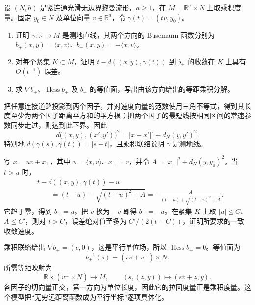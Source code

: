 \begin{exercise}\label{g3:ex:product-busemann}
	设 \((N,h)\) 是紧连通光滑无边界黎曼流形，\(a\ge1\)，在 \(M=\mathbb R^a\times N\) 上取乘积度量。固定 \(y_0\in N\) 及单位向量 \(v\in\mathbb R^a\)，令 \(\gamma(t)=(tv,y_0)\)。
	\begin{enumerate}
		\item 证明 \(\gamma:\mathbb R\to M\) 是测地直线，其两个方向的 Busemann 函数分别为 \(b_+(x,y)=\langle x,v\rangle\)、\(b_-(x,y)=-\langle x,v\rangle\)。
		\item 对每个紧集 \(K\subset M\)，证明 \(t-d((x,y),\gamma(t))\) 到 \(b_+\) 的收敛在 \(K\) 上具有 \(O(t^{-1})\) 误差。
		\item 求 \(\nabla b_+\)、\(\operatorname{Hess}b_+\) 及 \(b_+\) 的等值面，写出由该方向给出的等距乘积分解。
	\end{enumerate}
\end{exercise}
\begin{solution}
	把任意连接道路投影到两个因子，并对速度向量的范数使用三角不等式，得到其长度至少为两个因子距离平方和的平方根；把两个因子的最短线按相同区间的常速参数同步走过，则达到此下界。因此
	\[
		d\bigl((x,y),(x',y')\bigr)^2
		=|x-x'|^2+d_N(y,y')^2.
	\]
	特别地 \(d(\gamma(s),\gamma(t))=|s-t|\)，且乘积联络说明 \(\gamma\) 是测地线。

	写 \(x=uv+x_\perp\)，其中 \(u=\langle x,v\rangle\)、\(x_\perp\perp v\)，并令 \(A=|x_\perp|^2+d_N(y,y_0)^2\)。当 \(t>u\) 时，
	\[
	\begin{aligned}
		&t-d((x,y),\gamma(t))-u\\
		&\qquad=(t-u)-\sqrt{(t-u)^2+A}
		=-\frac{A}{(t-u)+\sqrt{(t-u)^2+A}}.
	\end{aligned}
	\]
	它趋于零，得到 \(b_+=u\)。把 \(v\) 换为 \(-v\) 即得 \(b_-=-u\)。在紧集 \(K\) 上取 \(|u|\le C\)、\(A\le C'\)，则对 \(t>C\)，误差绝对值至多为 \(C'/(2(t-C))\)，证明所要求的一致收敛速度。

	乘积联络给出 \(\nabla b_+=(v,0)\)，这是平行单位场，所以 \(\operatorname{Hess}b_+=0\)。等值面为
	\[
		b_+^{-1}(s)=(sv+v^\perp)\times N.
	\]
	所需等距映射为
	\[
		\mathbb R\times(v^\perp\times N)\longrightarrow M,
		\qquad(s,(z,y))\longmapsto(sv+z,y).
	\]
	各因子的切向量正交，第一方向为单位长度，因此它的拉回度量正是乘积度量。这个模型把“无穷远距离函数成为平行坐标”逐项具体化。
\end{solution}
